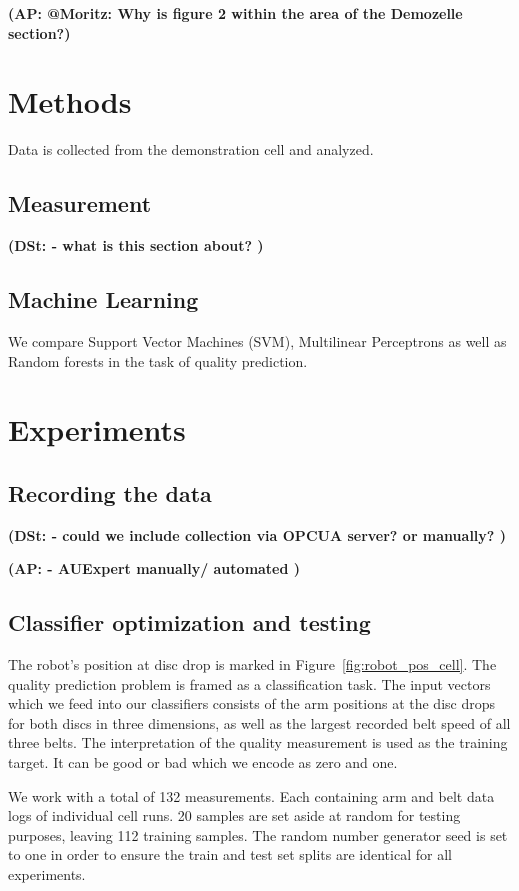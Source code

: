\documentclass[5p,times,procedia]{elsarticle}
\newcommand{\AP}[1]{{\color{blue} {\bf (AP: #1)}}}
\newcommand{\DSt}[1]{{\color{orange} {\bf (DSt: #1)}}}
\begin{document}
\AP{ @Moritz: Why is figure 2 within the area of the Demozelle section?}

\section{Methods} %

Data  is collected from the demonstration cell and analyzed.

\subsection{Measurement}
\DSt{
- what is this section about?
}

\subsection{Machine Learning}
We compare Support Vector Machines (SVM), Multilinear Perceptrons
\cite{bishop2006pattern} as well as Random forests in the task of
quality prediction. 


\section{Experiments}

\subsection{Recording the data} %
\DSt{
- could we include collection via OPCUA server? or manually? 
}

\AP{
       - AUExpert manually/ automated
}

\subsection{Classifier optimization and testing}\label{sec:ml_exp}
The robot's position at disc drop is marked in 
Figure~\ref{fig:robot_pos_cell}. The quality prediction problem is 
framed as a classification task. The input vectors which we feed into our
classifiers consists of the arm positions at the disc drops for both
discs in three dimensions, as well as the largest recorded belt speed
of all three belts. The interpretation of the quality measurement is 
used as the training target. It can be good or bad which we encode as 
zero and one.

We work with a total of 132 measurements. Each containing arm and belt data
logs of individual cell runs. 20 samples are set aside at random for testing 
purposes, leaving 112 training samples. The random number generator seed is
set to one in order to ensure the train and test set splits are identical 
for all experiments.
\end{document}
